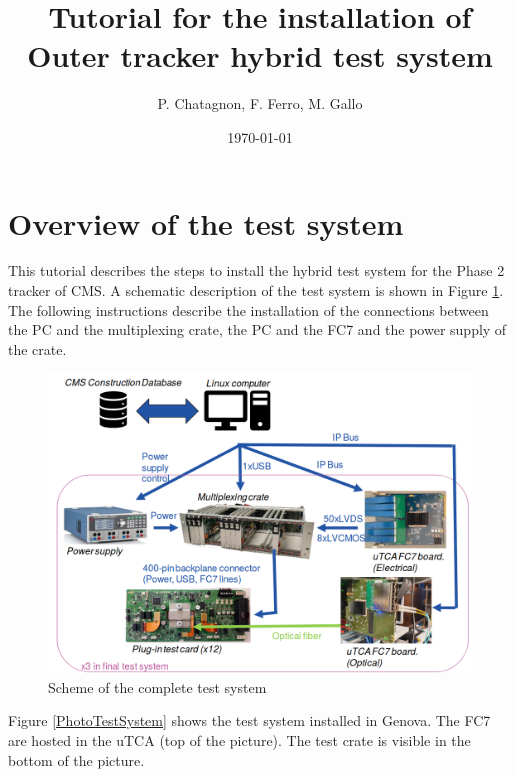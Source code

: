 \documentclass[10pt,a4paper]{article}
\begin{document}
\title{Tutorial for the installation of Outer tracker hybrid test system}
\author{P. Chatagnon, F. Ferro, M. Gallo}
\date{\today} 

\maketitle

\tableofcontents

\newpage

\section{Overview of the test system}

This tutorial describes the steps to install the hybrid test system for the Phase 2 tracker of CMS. A schematic description of the test system is shown in Figure \ref{TestSchematic}. The following instructions describe the installation of the connections between the PC and the multiplexing crate, the PC and the FC7 and the power supply of the crate. 
\begin{figure}[h!]
 \includegraphics[width=\linewidth]{TestOverview.png} 
  \caption{Scheme of the complete test system}
  \label{TestSchematic}
\end{figure}

Figure \ref{PhotoTestSystem} shows the test system installed in Genova. The FC7 are hosted in the uTCA (top of the picture). The test crate is visible in the bottom of the picture.
\end{document}
